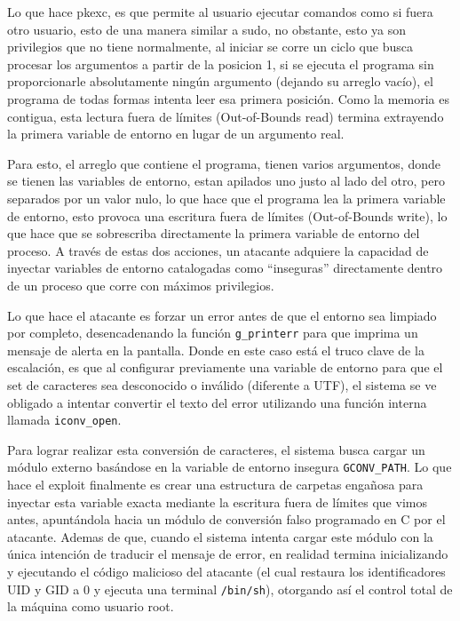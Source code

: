 \documentclass[letterpaper,11pt]{article}
\begin{document}
Lo que hace pkexc, es que permite al usuario ejecutar comandos como si fuera otro usuario, esto de una manera similar a sudo, no obstante, esto ya son privilegios 
que no tiene normalmente, al iniciar se corre un ciclo que busca procesar los argumentos a 
partir de la posicion 1, si se ejecuta el programa sin 
proporcionarle absolutamente ningún argumento (dejando su arreglo vacío), 
el programa de todas formas intenta leer esa primera posición. 
Como la memoria es contigua, esta lectura fuera de límites (Out-of-Bounds 
read) termina extrayendo la primera variable de entorno en lugar de un 
argumento real.

Para esto, el arreglo que contiene el programa, tienen varios argumentos, donde se tienen las variables 
de entorno, estan apilados uno justo al lado del otro, pero separados 
por un valor nulo, lo que hace que el programa lea la primera variable de entorno,
esto provoca una escritura fuera de límites (Out-of-Bounds write), 
lo que hace que se sobrescriba directamente la primera variable de 
entorno del proceso. A través de estas dos acciones, 
un atacante adquiere la capacidad de inyectar variables de entorno 
catalogadas como ``inseguras'' directamente dentro de un proceso que 
corre con máximos privilegios.

Lo que hace el atacante es forzar un error antes de que el entorno 
sea limpiado por completo, desencadenando la función 
\texttt{g\_printerr} para que imprima un mensaje de alerta en la pantalla. 
Donde en este caso está el truco clave de la escalación, es que al configurar 
previamente una variable de entorno para que el set de caracteres sea 
desconocido o inválido (diferente a UTF), el sistema se ve obligado a 
intentar convertir el texto del error utilizando una función interna 
llamada \texttt{iconv\_open}.

Para lograr realizar esta conversión de caracteres, el sistema busca 
cargar un módulo externo basándose en la variable de entorno insegura 
\texttt{GCONV\_PATH}. Lo que hace el exploit finalmente es crear 
una estructura de carpetas engañosa para inyectar esta variable 
exacta mediante la escritura fuera de límites que vimos antes, 
apuntándola hacia un módulo de conversión falso programado en C 
por el atacante. Ademas de que, cuando el sistema intenta cargar este 
módulo con la única intención de traducir el mensaje de error, en realidad 
termina inicializando y ejecutando el código malicioso del atacante 
(el cual restaura los identificadores UID y GID a 0 y ejecuta una 
terminal \texttt{/bin/sh}), 
otorgando así el control total de la máquina como usuario root.
\end{document}
